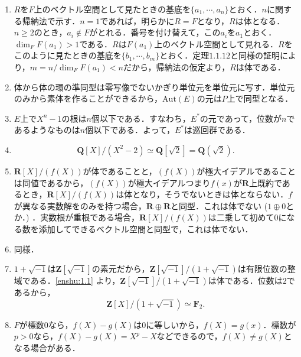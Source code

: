 \documentclass[a4paper,10pt]{ltjsarticle}
\begin{document}
\begin{enumerate}[]
  \item $R$を$F$上のベクトル空間として見たときの基底を$\{a_1, \cdots , a_n\}$とおく．$n$に関する帰納法で示す．$n = 1$であれば，明らかに$R = F$となり，$R$は体となる．$n \ge 2$のとき，$a_i \notin F$がとれる．番号を付け替えて，この$a_i$を$a_1$とおく．$\dim_FF(a_1) > 1$である．$R$は$F(a_1)$上のベクトル空間として見れる．$R$をこのように見たときの基底を$\{b_1, \cdots , b_m\}$とおく．定理$1.1.12$と同様の証明により，$m = n / \dim_FF(a_1) < n$だから，帰納法の仮定より，$R$は体である．
  \label{enshu:1.1} 

  \item 体から体の環の準同型は零写像でないかぎり単位元を単位元に写す．単位元のみから素体を作ることができるから，$\mathrm{Aut}(E)$の元は$P$上で同型となる．
  \label{enshu:1.2}

  \item $E$上で$X^n - 1$の根は$n$個以下である．すなわち，$E^*$の元であって，位数が$n$であるようなものは$n$個以下である．よって，$E^*$は巡回群である．
  \label{enshu:1.3}

  \item 
  \[ \mathbf{Q}[X] / (X^2 - 2) \simeq \mathbf{Q}[\sqrt 2] = \mathbf{Q}(\sqrt 2). \]
  \label{enshu:1.4}

  \item $\mathbf{R}[X] / (f(X))$が体であることと，$(f(X))$が極大イデアルであることは同値であるから，$(f(X))$が極大イデアルつまり$f(x)$が$\mathbf{R}$上既約であるとき，$\mathbf{R}[X] / (f(X))$は体となり，そうでないときは体とならない．$f$が異なる実数解をのみを持つ場合，$\mathbf{R} \oplus \mathbf{R}$と同型．これは体でない ($1 \oplus 0$とか．) ．実数根が重根である場合，$\mathbf{R}[X] / (f(X))$は二乗して初めて$0$になる数を添加してできるベクトル空間と同型で，これは体でない．
  \label{enshu:1.5}

  \item 同様．\label{enshu:1.6}

  \item $1 + \sqrt{-1}$は$\mathbf{Z}[\sqrt{-1}]$の素元だから，$\mathbf{Z}[\sqrt{-1}] / (1 + \sqrt{-1})$は有限位数の整域である．\ref{enshu:1.1} より，$\mathbf{Z}[\sqrt{-1}] / (1 + \sqrt{-1})$は体である．位数は$2$であるから，
  \[ \mathbf{Z}[X] / (1 + \sqrt{-1}) \simeq \mathbf{F}_2. \]
  \label{enshu:1.7}

  \item \label{enshu:1.8} $F$が標数$0$なら，$f(X) - g(X)$は$0$に等しいから，$f(X) = g(x)$．標数が$p > 0$なら，$f(X) - g(X) = X^p - X$などできるので，$f(X) \neq g(X)$となる場合がある．


\end{enumerate}
\end{document}

